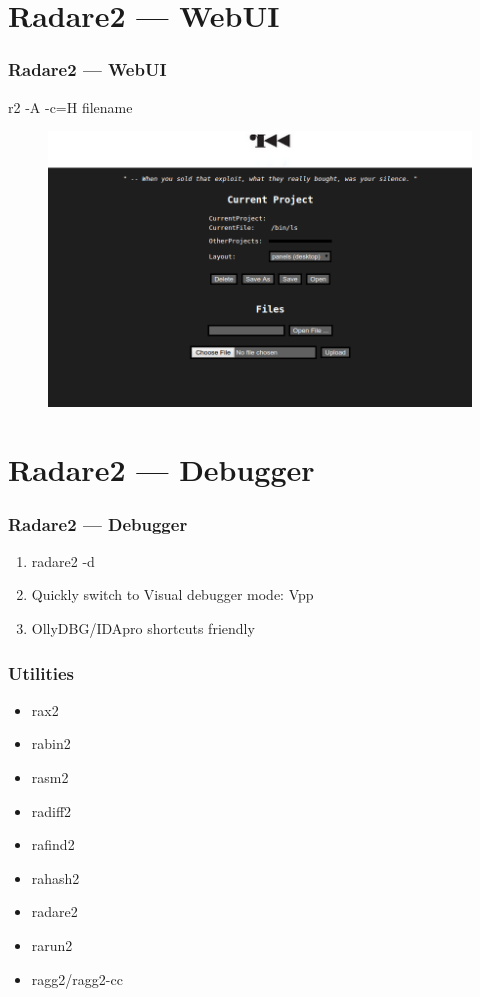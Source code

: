 \documentclass[10pt, compress]{beamer}
\begin{document}
\section{Radare2 — WebUI}
\begin{frame}[fragile]
  \frametitle{Radare2 — WebUI}
  r2 -A -c=H filename
    \begin{figure}
  \includegraphics[width=\textwidth]{web.png}
  \end{figure}
\end{frame}

\section{Radare2 — Debugger}

\begin{frame}[fragile]
  \frametitle{Radare2 — Debugger}
  \begin{enumerate}
  \item radare2 -d
  \item Quickly switch to Visual debugger mode: Vpp
  \item OllyDBG/IDApro shortcuts friendly
 \end{enumerate}
\end{frame}

\begin{frame}[fragile]
  \frametitle{Utilities}
     \begin{itemize}
        \item rax2
        \item rabin2
        \item rasm2
        \item radiff2
        \item rafind2
        \item rahash2
        \item radare2
        \item \alert{rarun2}
        \item ragg2/ragg2-cc
      \end{itemize}
\end{frame}
\end{document}
